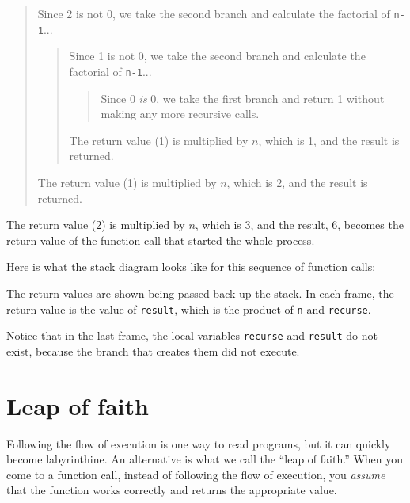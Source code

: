 \begin{quote}
Since 2 is not 0, we take the second branch and calculate the factorial of
{\tt n-1}...


  \begin{quote}
  Since 1 is not 0, we take the second branch and calculate the factorial
  of {\tt n-1}...


    \begin{quote}
    Since 0 {\em is} 0, we take the first branch and return 1
    without making any more recursive calls.
    \end{quote}


  The return value (1) is multiplied by $n$, which is 1, and the
  result is returned.
  \end{quote}


The return value (1) is multiplied by $n$, which is 2, and the
result is returned.
\end{quote}


The return value (2) is multiplied by $n$, which is 3, and the result, 6,
becomes the return value of the function call that started the whole
process.

Here is what the stack diagram looks like for this sequence of function
calls:

\vspace{0.1in}
\beforefig
\centerline{}
\afterfig
\vspace{0.1in}

The return values are shown being passed back up the stack.
In each frame, the return value is
the value of {\tt result}, which is the product of {\tt n}
and {\tt recurse}.

Notice that in the last frame, the local
variables {\tt recurse} and {\tt result} do not exist, because
the branch that creates them did not execute.



\section{Leap of faith}

Following the flow of execution is one way to read programs, but
it can quickly become labyrinthine.  An
alternative is what we call the ``leap of faith.'' When you come to a
function call, instead of following the flow of execution, you {\em
assume} that the function works correctly and returns the appropriate
value.

